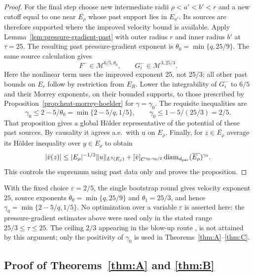 \documentclass[11pt,reqno]{amsart}
\begin{document}
\begin{proof}
For the final step choose new intermediate radii
$\rho<a'<b'<r$ and a new cutoff equal to one near $\overline{E_\rho}$
whose past support lies in $E_{a'}$. Its sources are therefore supported
where the improved velocity bound is available. Apply
Lemma~\ref{lem:pressure-gradient-past} with outer radius $r$ and
inner radius $b'$ at $\tau=25$. The resulting past pressure-gradient
exponent is $\theta_0=\min\{q,25/9\}$. The same source calculation gives
\[
 F^-\in\mathcal M^{6/5,\theta_0},\qquad
 G_i^-\in\mathcal M^{3,25/3}.
\]
Here the nonlinear term uses the improved exponent 25, not 25/3;
all other past bounds on $E_r$ follow by restriction from $E_R$.
Lower the integrability of $G_i^-$ to $6/5$ and their Morrey exponents,
on their bounded supports, to those prescribed by
Proposition~\ref{prop:heat-morrey-hoelder} for $\gamma=\gamma_0$.
The requisite inequalities are
\[
 \gamma_0\le2-5/\theta_0=\min\{2-5/q,1/5\},\qquad
 \gamma_0\le1-5/(25/3)=2/5.
\]
That proposition gives a global H\"older representative of the
potential of these past sources. By causality it agrees a.e.\ with u
on $E_\rho$. Finally, for $z\in\overline{E_\rho}$ average its
H\"older inequality over $y\in E_\rho$ to obtain
\[
 |\bar v(z)|\le |E_\rho|^{-1/3}\|u\|_{L^3(E_\rho)}
       +[\bar v]_{C^{\gamma_0,\gamma_0/2}}
            \operatorname{diam}_{d_{\mathrm{par}}}(\overline{E_\rho})^{\gamma_0}.
\]
This controls the supremum using past data only and proves the proposition.
\end{proof}

\begin{remark}\label{rem:exponent}
With the fixed choice $\varepsilon=2/5$, the single bootstrap round gives
velocity exponent $25$, source exponents
$\theta_0=\min\{q,25/9\}$ and $\theta_1=25/3$, and hence
$\gamma_0=\min\{2-5/q,1/5\}$. No optimization over a variable
$\varepsilon$ is asserted here: the pressure-gradient estimates above
were used only in the stated range $25/3\le\tau\le25$.
The ceiling $2/3$ appearing in the blow-up route
\cite[Lemma 2.4]{LadyzhenskayaSeregin1999},
\cite[Remark 6.6]{Tsai2018} is not attained by this argument; only the
positivity of $\gamma_0$ is used in Theorems~\ref{thm:A}--\ref{thm:C}.
\end{remark}

\subsection{Proof of Theorems~\ref{thm:A} and \ref{thm:B}}\label{ss:assembly}
\end{document}
